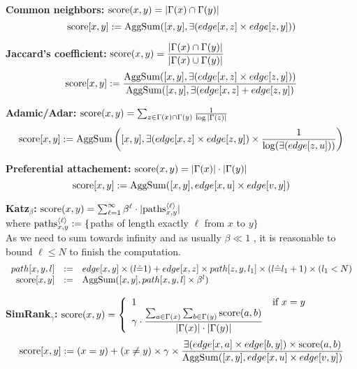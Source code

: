 \documentclass[11pt]{article}
\begin{document}
{\bf Common neighbors:} ${\rm score}(x,y)=|\Gamma(x) \cap \Gamma(y)|$
\[{\rm score}[x,y] := {\rm AggSum}([x,y], \exists(edge[x,z] \times edge[z,y]))\]

{\bf Jaccard's coefficient:} ${\rm score}(x,y)=\dfrac{|\Gamma(x) \cap \Gamma(y)|}{|\Gamma(x) \cup \Gamma(y)|}$
\[{\rm score}[x,y] := \dfrac{{\rm AggSum}([x,y], \exists(edge[x,z] \times edge[z,y]))}
					{{\rm AggSum}([x,y], \exists(edge[x,z] + edge[z,y])}\]

{\bf Adamic/Adar:} ${\rm score}(x,y)=\sum_{z\in \Gamma(x) \cap \Gamma(y)}\frac{1}{\log|\Gamma(z)|}$
\[{\rm score}[x,y] := {\rm AggSum}\left([x,y], \exists(edge[x,z]\times edge[z,y])  \times \dfrac{1}{\log(\exists(edge[z,u]))}\right)\]

{\bf Preferential attachement:} ${\rm score}(x,y)=|\Gamma(x)| \cdot |\Gamma(y)|$
\[{\rm score}[x,y] := {\rm AggSum}([x,y], edge[x,u] \times edge[v,y])\]

{\bf Katz${}_{\beta}$:} ${\rm score}(x,y)=\sum_{\ell=1}^{\infty} \beta^\ell \cdot |{\rm paths}_{x,y}^{\langle\ell\rangle}|$ \\where ${\rm paths}_{x,y}^{\langle\ell\rangle} := \{$paths of length exactly $\ell$ from $x$ to $y\}$\\
As we need to sum towards infinity and as usually $\beta \ll 1$ \cite{linkpred}, it is reasonable to bound $\ell \le N$ to finish the computation.
\[\begin{array}{rcl}
path[x,y,l] &:=& edge[x,y] \times (l\hat=1) +  edge[x,z] \times path[z,y,l_1] \times (l\hat= l_1+1) \times (l_1<N)\\
{\rm score}[x,y] &:=& {\rm AggSum}([x,y], path[x,y,l] \times \beta^l )
\end{array}\]

{\bf SimRank${}_\gamma$:} ${\rm score}(x,y)=\left\{\begin{array}{ll}1&\text{if }x=y\\
	\gamma\cdot\dfrac{\sum_{a\in\Gamma(x)}\sum_{b\in\Gamma(y)} {\rm score}(a,b)}
		{|\Gamma(x)| \cdot |\Gamma(y)|} \end{array}\right.$
\[{\rm score}[x,y] := (x=y) + (x\ne y) \times\gamma\times\dfrac
	{\exists(edge[x,a] \times edge[b,y]) \times {\rm score}(a,b)}
	{{\rm AggSum}([x,y], edge[x,u] \times edge[v,y])}\]
\end{document}

